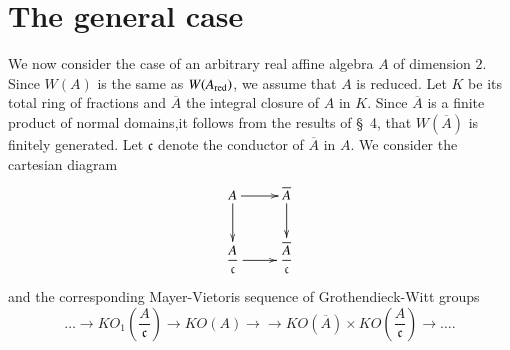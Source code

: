 \section{The general case}\label{s5}

We now consider the case of an arbitrary real affine algebra $A$ of dimension $2$. Since $W(A)$ is the same as $W(A_{\mathrm{red}})$, we assume that $A$ is reduced. Let $K$ be its total ring of fractions and $\overline{A}$ the integral closure of $A$ in $K$. Since $\overline{A}$ is a finite product of normal domains,\pageoriginale it follows from the results of \S\ 4, that $W(\overline{A})$ is finitely generated. Let $\mathfrak{c}$ denote the conductor of $\overline{A}$ in $A$. We consider the cartesian diagram 
$$
\xymatrix{A\ar[r]\ar[d]&\overline{A}\ar[d]\\
\dfrac{A}{\mathfrak{c}}\ar[r]& \dfrac{\overline{A}}{\mathfrak{c}}}
$$
and the corresponding Mayer-Vietoris sequence of Grothendieck-Witt groups 
$$
\ldots\to KO_1\left(\dfrac{A}{\mathfrak{c}}\right)\to KO(A)\to\to KO\left(\overline{A}\right)\times KO\left(\dfrac{A}{\mathfrak{c}}\right)\to\ldots. 
$$

